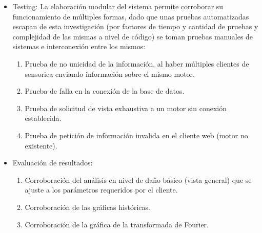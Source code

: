 \begin{itemize}
    \item Testing: La elaboración modular del sistema permite  corroborar su
        funcionamiento de múltiples formas, dado que unas pruebas automatizadas
        escapan de esta investigación (por factores de tiempo y cantidad de pruebas
        y complejidad de las mismas a nivel de código) se toman pruebas manuales
        de sistemas e interconexión entre los mismos:
        \begin{enumerate}
            \item Prueba de no unicidad de la información, al haber múltiples
                clientes de sensorica enviando información sobre el mismo motor.
            \item Prueba de falla en la conexión de la base de datos.
            \item Prueba de solicitud de vista exhaustiva a un motor sin conexión
                establecida.
            \item Prueba de petición de información invalida en el cliente web
                (motor no existente).
        \end{enumerate}

    \item Evaluación de resultados:
        \begin{enumerate}
            \item Corroboración del análisis en nivel de daño básico (vista general)
                que se ajuste a los parámetros requeridos por el cliente.
            \item Corroboración de las gráficas históricas.
            \item Corroboración de la gráfica de la transformada de Fourier.
        \end{enumerate}
\end{itemize}


